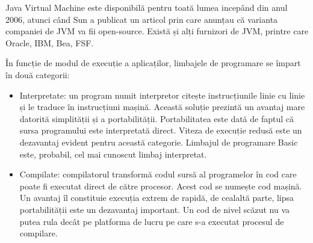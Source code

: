 \documentclass[12pt]{book}
\begin{document}
Java Virtual Machine este disponibilă pentru toată lumea incepând din anul 2006, atunci când Sun a publicat un articol prin care anunțau că varianta companiei de JVM va fii open-source. Există și alți furnizori de JVM, printre care Oracle, IBM, Bea, FSF.

În funcție de modul de execuție a aplicaților, limbajele de programare se împart în două categorii:
\begin{addmargin}[4em]{1em}
	\begin{itemize}
		\item Interpretate: un program numit interpretor citește instrucțiunile linie cu linie și le traduce în instrucțiuni mașină. Această soluție prezintă un avantaj mare datorită simplității și a portabilității. Portabilitatea este dată de faptul că sursa programului este interpretată direct. Viteza de execuție redusă este un dezavantaj evident pentru această categorie. Limbajul de programare Basic este, probabil, cel mai cunoscut limbaj interpretat.
		\item Compilate: compilatorul transformă codul sursă al programelor în cod care poate fi executat direct de către procesor. Acest cod se numește cod mașină. Un avantaj îl constituie execuția extrem de rapidă, de cealaltă parte, lipsa portabilității este un dezavantaj important. Un cod de nivel scăzut nu va putea rula decât pe platforma de lucru pe care s-a executat procesul de compilare.  
	\end{itemize}
\end{addmargin}
\bigbreak
\end{document}
